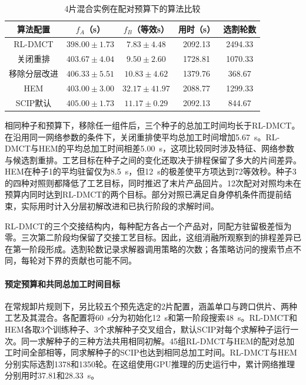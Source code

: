 \documentclass[preprint,12pt,nonatbib]{elsarticle}
\begin{document}
\begin{table}[!htbp]\centering\small
\caption{4片混合实例在配对预算下的算法比较}
\label{tab:mixed-ablation-cn}
\setlength{\tabcolsep}{2.3pt}
\begin{tabular}{@{}*{5}{c}@{}}\toprule
算法配置 & $f_A$（s） & $f_B$（等效s） & 用时（s） & 选割轮数\\\midrule
RL-DMCT & $398.00\pm1.73$ & $7.83\pm4.48$ & 2092.13 & 2494.33\\
关闭重排 & $403.67\pm4.04$ & $9.50\pm2.60$ & 1728.81 & 1070.33\\
移除分层改进 & $406.33\pm5.51$ & $10.83\pm4.62$ & 1379.76 & 368.67\\\midrule
HEM & $403.00\pm3.00$ & $32.17\pm41.97$ & 2088.77 & 1299.33\\
SCIP默认 & $405.00\pm1.73$ & $11.17\pm0.29$ & 2092.13 & 844.67\\
\bottomrule\end{tabular}
\end{table}

相同种子和预算下，移除任一组件后，三个种子的总加工时间均长于RL-DMCT。在沿用同一网络参数的条件下，关闭重排使平均总加工时间增加5.67~s。RL-DMCT与HEM的平均总加工时间相差5.00~s，这项比较同时涉及特征、网络参数与候选割重排。工艺目标在种子之间的变化还取决于排程保留了多大的片间差异。HEM在种子1的平均驻留仅为8.5~s，但12~s的极差使平方项达到72等效秒。种子3的四种对照则都降低了工艺目标，同时推迟了末片产品回片。12次配对对照均未在预算内同时达到RL-DMCT的两个目标。部分对照已满足自身停机条件而提前结束，实际用时计入分层初解改进和已执行阶段的求解时间。

RL-DMCT的三个交接结构内，每种配方各占一个产品对，同配方驻留极差恒为零。三次第二阶段均保留了交接工艺目标。因此，这组消融所观察到的排程差异已在第一阶段形成。选割轮数记录求解器调用策略的次数；各策略访问的搜索节点不同，每轮对下界的贡献也可能不同。

\paragraph{预定预算和共同总加工时间目标}
在常规卸片规则下，另比较五个预先选定的2片配置，涵盖单口与跨口供片、两种工艺及其混合。各配置将60~s分为初始化12~s和第一阶段搜索48~s。RL-DMCT和HEM各取3个训练种子、3个求解种子交叉组合，默认SCIP对每个求解种子运行一次。同一求解种子的三种方法共用相同初解。45组RL-DMCT与HEM的配对总加工时间全部相等，同求解种子的SCIP也达到相同总加工时间。RL-DMCT与HEM分别实际选割1378和1350轮。在这组使用GPU推理的历史运行中，累计网络推理分别用时37.81和28.33~s。
\end{document}

